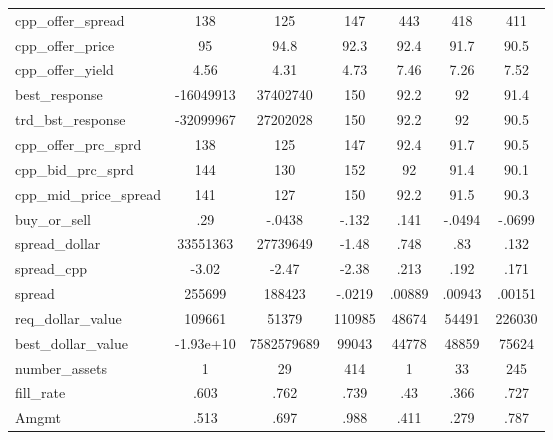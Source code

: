 \begin{tabular}{l*{6}{c}}
cpp\_offer\_spread              &          138&          125&          147&          443&          418&          411\\
cpp\_offer\_price               &           95&         94.8&         92.3&         92.4&         91.7&         90.5\\
cpp\_offer\_yield               &         4.56&         4.31&         4.73&         7.46&         7.26&         7.52\\
best\_response                 &    -16049913&     37402740&          150&         92.2&           92&         91.4\\
trd\_bst\_response              &    -32099967&     27202028&          150&         92.2&           92&         90.5\\
cpp\_offer\_prc\_sprd            &          138&          125&          147&         92.4&         91.7&         90.5\\
cpp\_bid\_prc\_sprd              &          144&          130&          152&           92&         91.4&         90.1\\
cpp\_mid\_price\_spread          &          141&          127&          150&         92.2&         91.5&         90.3\\
buy\_or\_sell                   &          .29&       -.0438&        -.132&         .141&       -.0494&       -.0699\\
spread\_dollar                 &     33551363&     27739649&        -1.48&         .748&          .83&         .132\\
spread\_cpp                    &        -3.02&        -2.47&        -2.38&         .213&         .192&         .171\\
spread                        &       255699&       188423&       -.0219&       .00889&       .00943&       .00151\\
req\_dollar\_value              &       109661&        51379&       110985&        48674&        54491&       226030\\
best\_dollar\_value             &    -1.93e+10&   7582579689&        99043&        44778&        48859&        75624\\
number\_assets                 &            1&           29&          414&            1&           33&          245\\
fill\_rate                     &         .603&         .762&         .739&          .43&         .366&         .727\\
Amgmt                         &         .513&         .697&         .988&         .411&         .279&         .787\\

\end{tabular}

